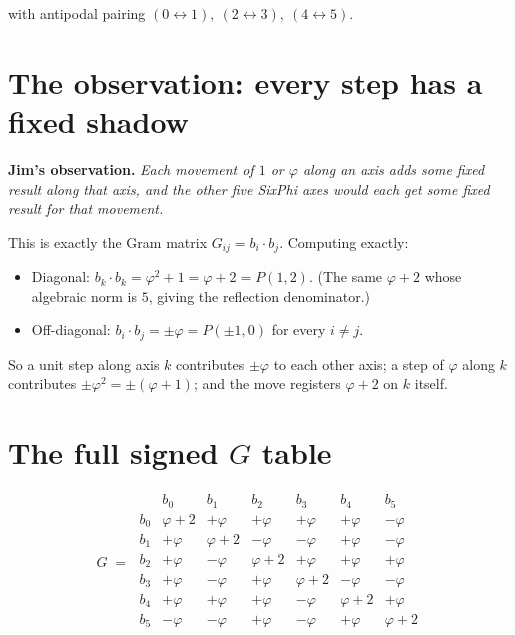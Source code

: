\documentclass[11pt]{article}
\newcommand{\phigold}{\varphi}
\begin{document}
with antipodal pairing \((0\!\leftrightarrow\!1),\ (2\!\leftrightarrow\!3),\
(4\!\leftrightarrow\!5)\).

\section{The observation: every step has a fixed shadow}

\textbf{Jim's observation.}\quad
\emph{Each movement of \(1\) or \(\phigold\) along an axis adds some fixed
result along that axis, and the other five SixPhi axes would each get some
fixed result for that movement.}

This is exactly the Gram matrix
\(G_{ij} = b_i \cdot b_j\). Computing exactly:
\begin{itemize}
  \item Diagonal: \(b_k \cdot b_k = \phigold^2 + 1 = \phigold + 2 = P(1,2)\).
        (The same \(\phigold+2\) whose algebraic norm is \(5\), giving the
        reflection denominator.)
  \item Off-diagonal: \(b_i \cdot b_j = \pm\phigold = P(\pm 1, 0)\) for every
        \(i \neq j\).
\end{itemize}

So a unit step along axis \(k\) contributes \(\pm\phigold\) to each other
axis; a step of \(\phigold\) along \(k\) contributes
\(\pm\phigold^2 = \pm(\phigold+1)\); and the move registers \(\phigold+2\)
on \(k\) itself.

\section{The full signed \texorpdfstring{$G$}{G} table}

\[
G \;=\;
\begin{array}{c|cccccc}
        & b_0      & b_1      & b_2      & b_3      & b_4      & b_5      \\ \hline
b_0     & \phigold{+}2 & +\phigold    & +\phigold    & +\phigold    & +\phigold    & -\phigold    \\
b_1     & +\phigold    & \phigold{+}2 & -\phigold    & -\phigold    & +\phigold    & -\phigold    \\
b_2     & +\phigold    & -\phigold    & \phigold{+}2 & +\phigold    & +\phigold    & +\phigold    \\
b_3     & +\phigold    & -\phigold    & +\phigold    & \phigold{+}2 & -\phigold    & -\phigold    \\
b_4     & +\phigold    & +\phigold    & +\phigold    & -\phigold    & \phigold{+}2 & +\phigold    \\
b_5     & -\phigold    & -\phigold    & +\phigold    & -\phigold    & +\phigold    & \phigold{+}2 \\
\end{array}
\]
\end{document}
